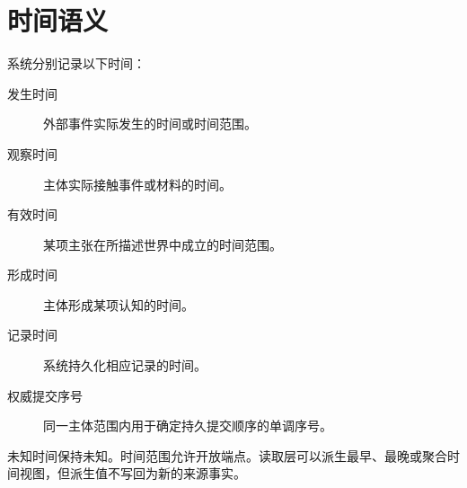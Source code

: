 \section{时间语义}

系统分别记录以下时间：

\begin{description}
\item[发生时间] 外部事件实际发生的时间或时间范围。
\item[观察时间] 主体实际接触事件或材料的时间。
\item[有效时间] 某项主张在所描述世界中成立的时间范围。
\item[形成时间] 主体形成某项认知的时间。
\item[记录时间] 系统持久化相应记录的时间。
\item[权威提交序号] 同一主体范围内用于确定持久提交顺序的单调序号。
\end{description}

未知时间保持未知。时间范围允许开放端点。读取层可以派生最早、最晚或聚合时间视图，但派生值不写回为新的来源事实。

